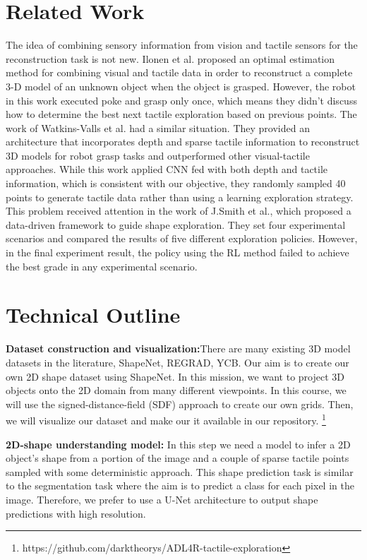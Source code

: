 \documentclass[conference]{IEEEtran}
\begin{document}
\section{Related Work}
The idea of combining sensory information from vision and tactile sensors for the reconstruction task is not new. Ilonen et al.\cite{6631074} proposed an optimal estimation method for combining visual and tactile data in order to reconstruct a complete 3-D model of  an unknown object when the object is grasped.  However, the robot in this work executed poke and grasp only once, which means they didn’t discuss how to determine the best next tactile exploration based on previous points. The work of Watkins-Valls et al. had a similar situation.\cite{https://doi.org/10.48550/arxiv.1803.07671}  They provided an architecture that incorporates depth and sparse tactile information to reconstruct 3D models for robot grasp tasks and outperformed other visual-tactile approaches. While this work applied CNN fed with both depth and tactile information, which is consistent with our objective, they randomly sampled 40 points to generate tactile data rather than using a learning exploration strategy. This problem received attention in the work of J.Smith et al.\cite{https://doi.org/10.48550/arxiv.2107.09584}, which proposed a data-driven framework to guide shape exploration. They set four experimental scenarios and compared the results of five different exploration policies. However, in the final experiment result, the policy using the RL method failed to achieve the best grade in any experimental scenario. 

\section{Technical Outline}
\textbf{Dataset construction and visualization:}There are many existing 3D model datasets in the literature, ShapeNet\cite{https://doi.org/10.48550/arxiv.1512.03012}, REGRAD\cite{https://doi.org/10.48550/arxiv.2104.14118}, YCB\cite{Calli_2015}. Our aim is to create our own 2D shape dataset using ShapeNet. In this mission, we want to project 3D objects onto the 2D domain from many different viewpoints. In this course, we will use the signed-distance-field (SDF) approach to create our own grids. Then, we will visualize our dataset and make our it available in our repository. \footnote{https://github.com/darktheorys/ADL4R-tactile-exploration} 

\textbf{2D-shape understanding model:} In this step we need a model to infer a 2D object's shape from a portion of the image and a couple of sparse tactile points sampled with some deterministic approach. This shape prediction task is similar to the segmentation task where the aim is to predict a class for each pixel in the image. Therefore, we prefer to use a U-Net\cite{https://doi.org/10.48550/arxiv.1505.04597} architecture to output shape predictions with high resolution.
\end{document}
